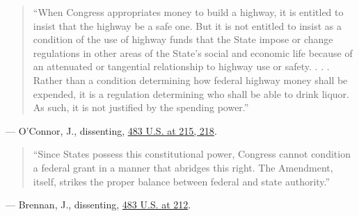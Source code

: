 \documentclass[12pt]{article}
\begin{document}
\begin{quote}
``When Congress appropriates money to build a highway, it is entitled to insist that the highway be a safe one. But it is not entitled to insist as a condition of the use of highway funds that the State impose or change regulations in other areas of the State's social and economic life because of an attenuated or tangential relationship to highway use or safety. . . . Rather than a condition determining how federal highway money shall be expended, it is a regulation determining who shall be able to drink liquor. As such, it is not justified by the spending power.''
\end{quote}
\noindent --- O'Connor, J., dissenting, \href{https://supreme.justia.com/cases/federal/us/483/203/}{483 U.S. at 215, 218}.

\begin{quote}
``Since States possess this constitutional power, Congress cannot condition a federal grant in a manner that abridges this right. The Amendment, itself, strikes the proper balance between federal and state authority.''
\end{quote}
\noindent --- Brennan, J., dissenting, \href{https://supreme.justia.com/cases/federal/us/483/203/}{483 U.S. at 212}.
\end{document}
